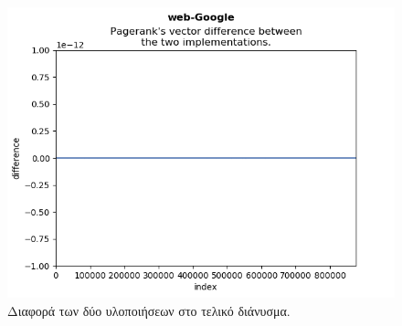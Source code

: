 \begin{figure}
\includegraphics[width=\linewidth]{plots/diff.png}
\caption{Διαφορά των δύο υλοποιήσεων στο τελικό διάνυσμα.}
\end{figure}